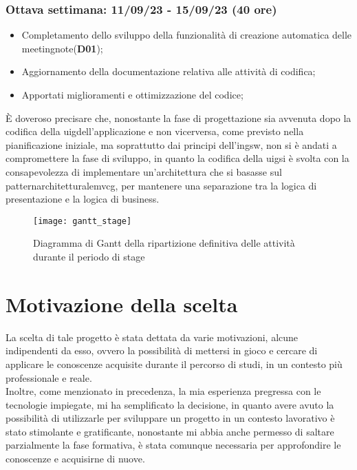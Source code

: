 \subsubsection{Ottava settimana: 11/09/23 - 15/09/23 (40 ore)}
    \begin{itemize}
        \item Completamento dello sviluppo della funzionalità di creazione automatica delle \gls{meetingnote}\glsoccur (\textbf{D01});
        \item Aggiornamento della documentazione relativa alle attività di codifica;
        \item Apportati miglioramenti e ottimizzazione del codice;
    \end{itemize}

È doveroso precisare che, nonostante la fase di progettazione sia avvenuta dopo la codifica della \gls{uig}\glsoccur dell'applicazione e non vicerversa, come previsto nella pianificazione iniziale, ma soprattutto dai principi dell'\gls{ingsw}\glsoccur, non si è andati a compromettere la fase di sviluppo, in quanto la codifica della \gls{uig}\glsoccur si è svolta con la consapevolezza di implementare un'architettura che si basasse sul \gls{patternarchitetturale}\glsoccur \Gls{mvcg}\glsoccur, per mantenere una separazione tra la logica di presentazione e la logica di business.

\begin{figure}[!h] 
    \centering 
    \texttt{[image: gantt\_stage]} 
    \caption{Diagramma di Gantt della ripartizione definitiva delle attività durante il periodo di stage}
    \label{fig:gantt}
\end{figure}

\section{Motivazione della scelta}
\label{sec:motivazione-scelta}

La scelta di tale progetto è stata dettata da varie motivazioni, alcune indipendenti da esso, ovvero la possibilità di mettersi in gioco e cercare di applicare le conoscenze acquisite durante il percorso di studi, in un contesto più professionale e reale. \\
Inoltre, come menzionato in precedenza, la mia esperienza pregressa con le tecnologie impiegate, mi ha semplificato la decisione, in quanto avere avuto la possibilità di utilizzarle per sviluppare un progetto in un contesto lavorativo è stato stimolante e gratificante, nonostante mi abbia anche permesso di saltare parzialmente la fase formativa, è stata comunque necessaria per approfondire le conoscenze e acquisirne di nuove.

